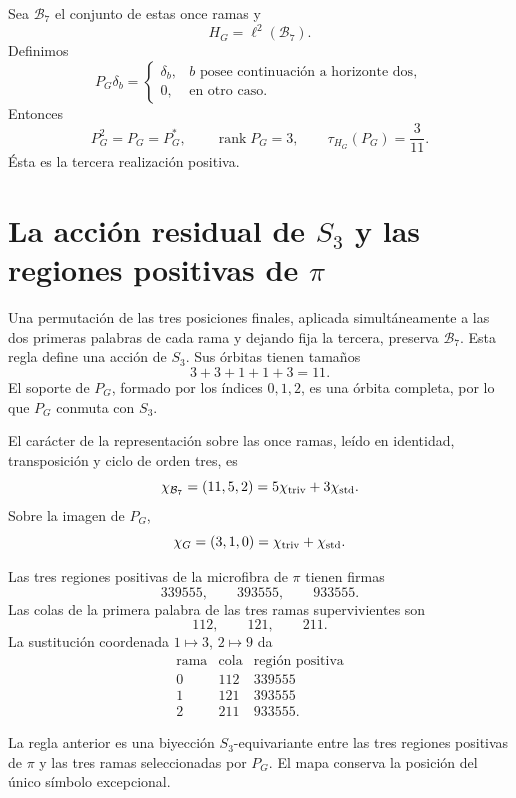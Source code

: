 Sea \(\mathcal B_7\) el conjunto de estas once ramas y
\[
 H_G=\ell^2(\mathcal B_7).
\]
Definimos
\[
 P_G\delta_b=
 \begin{cases}
 \delta_b,&b\text{ posee continuación a horizonte dos},\\
 0,&\text{en otro caso}.
 \end{cases}
\]
Entonces
\[
 P_G^2=P_G=P_G^*,
 \qquad
 \operatorname{rank}P_G=3,
 \qquad
 \boxed{\tau_{H_G}(P_G)=\frac3{11}.}
\]
Ésta es la tercera realización positiva.

\section{La acción residual de \texorpdfstring{\(S_3\)}{S3} y las regiones positivas de \texorpdfstring{\(\pi\)}{pi}}

Una permutación de las tres posiciones finales, aplicada simultáneamente a
las dos primeras palabras de cada rama y dejando fija la tercera, preserva
\(\mathcal B_7\). Esta regla define una acción de \(S_3\). Sus órbitas
tienen tamaños
\[
 3+3+1+1+3=11.
\]
El soporte de \(P_G\), formado por los índices \(0,1,2\), es una órbita
completa, por lo que \(P_G\) conmuta con \(S_3\).

El carácter de la representación sobre las once ramas, leído en identidad,
transposición y ciclo de orden tres, es
\[
 \chi_{\mathcal B_7}=(11,5,2)
 =5\chi_{\rm triv}+3\chi_{\rm std}.
\]
Sobre la imagen de \(P_G\),
\[
 \chi_G=(3,1,0)
 =\chi_{\rm triv}+\chi_{\rm std}.
\]

Las tres regiones positivas de la microfibra de \(\pi\) tienen firmas
\[
 339555,\qquad393555,\qquad933555.
\]
Las colas de la primera palabra de las tres ramas supervivientes son
\[
 112,\qquad121,\qquad211.
\]
La sustitución coordenada \(1\mapsto3\), \(2\mapsto9\) da
\[
\begin{array}{c|c|c}
\text{rama}&\text{cola}&\text{región positiva}\\ \hline
0&112&339555\\
1&121&393555\\
2&211&933555.
\end{array}
\]

\begin{theorem}
\label{thm:puente-pi-puerta-s3}
La regla anterior es una biyección \(S_3\)-equivariante entre las tres
regiones positivas de \(\pi\) y las tres ramas seleccionadas por \(P_G\).
El mapa conserva la posición del único símbolo excepcional.
\end{theorem}

